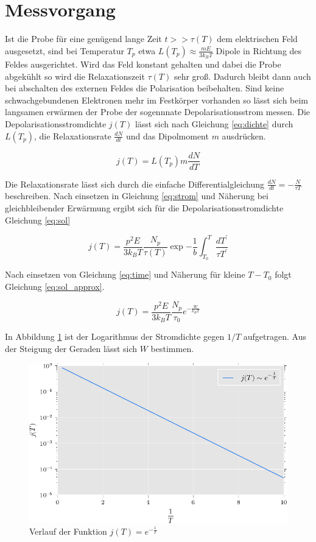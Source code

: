 \section{Messvorgang}
\label{sec:messvorgang}

Ist die Probe für eine genügend lange Zeit $t >> \tau(T)$ dem elektrischen Feld ausgesetzt, sind bei Temperatur $T_p$ etwa $L(T_p) \approx \frac{m E}{3 k_B T}$ Dipole in Richtung des
Feldes ausgerichtet. Wird das Feld konstant gehalten und dabei die Probe abgekühlt so wird die Relaxationszeit $\tau(T)$ sehr groß. Dadurch bleibt
dann auch bei abschalten des externen Feldes die Polarisation beibehalten.  Sind keine schwachgebundenen Elektronen mehr im Festkörper vorhanden so lässt sich beim langsamen
erwärmen der Probe der sogennnate Depolarisationsstrom messen. Die Depolarisationsstromdichte $j(T)$ lässt sich nach Gleichung \ref{eq:dichte} durch $L(T_p)$, die Relaxationsrate
$\frac{dN}{dt}$ und das Dipolmoment $m$ ausdrücken.

\begin{equation}
  \label{eq:strom}
  j(T) = L(T_p) m \frac{dN}{dT}
\end{equation}

Die Relaxationsrate lässt sich durch die einfache Differentialgleichung $\frac{dN}{dt} = - \frac{N}{\tau{T}}$ beschreiben. Nach einsetzen in Gleichung \ref{eq:strom} und Näherung
bei gleichbleibender Erwärmung ergibt sich für die Depolarisationsstromdichte Gleichung \ref{eq:sol}

\begin{equation}
  \label{eq:sol}
  j(T) = \frac{p^2 E}{3 k_B T} \frac{N_p}{\tau(T)} \exp{-\frac{1}{b} \int_{T_0}^{T} \frac{dT^{\prime}}{\tau{T^{\prime}}}}
\end{equation}


Nach einsetzen von Gleichung \ref{eq:time} und Näherung für kleine $T - T_0$ folgt Gleichung \ref{eq:sol_approx}.

\begin{equation}
  \label{eq:sol_approx}
  j(T) = \frac{p^2 E}{3 k_B T} \frac{N_p}{\tau_0} e^{- \frac{W}{k_B T}}
\end{equation}

In Abbildung \ref{fig:lnj} ist der Logarithmus der Stromdichte gegen $1/T$ aufgetragen. Aus der Steigung der Geraden lässt sich $W$ bestimmen.


\begin{figure}
  \label{fig:lnj}
  \includegraphics{./plots/strom.pdf}
  \caption{Verlauf der Funktion  $j(T) = e^{- \frac{1}{T}}$ }
\end{figure}
